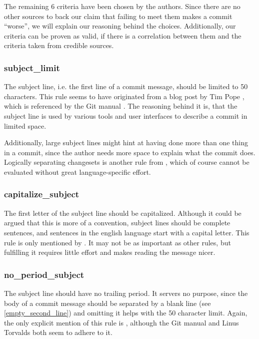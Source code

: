 The remaining 6 criteria have been chosen by the authors. Since there are no other sources to back our claim that failing to meet them makes a commit ``worse'', we will explain our reasoning behind the choices. Additionally, our criteria can be proven as valid, if there is a correlation between them and the criteria taken from credible sources. %

\subsubsection{subject\_limit}
\label{subs:subject_limit}
The subject line, i.e. the first line of a commit message, should be limited to 50 characters. This rule seems to have originated from a blog post by Tim Pope \cite{TP}, which is referenced by the Git manual \cite{OffGuide}. The reasoning behind it is, that the subject line is used by various tools and user interfaces to describe a commit in limited space.

Additionally, large subject lines might hint at having done more than one thing in a commit, since the author needs more space to explain what the commit does. Logically separating changesets is another rule from \cite{OffGuide}, which of course cannot be evaluated without great language-specific effort.

\subsubsection{capitalize\_subject}
\label{subs:capitalize_subject}
The first letter of the subject line should be capitalized. Although it could be argued that this is more of a convention, subject lines should be complete sentences, and sentences in the english language start with a capital letter. This rule is only mentioned by \cite{CB}. It may not be as important as other rules, but fulfilling it requires little effort and makes reading the message nicer.

\subsubsection{no\_period\_subject}
\label{subs:no_period_subject}
The subject line should have no trailing period. It servers no purpose, since the body of a commit message should be separated by a blank line (see \ref{empty_second_line}) and omitting it helps with the 50 character limit. Again, the only explicit mention of this rule is \cite{CB}, although the Git manual \cite{OffGuide} and Linus Torvalds \cite{SR} both seem to adhere to it.

